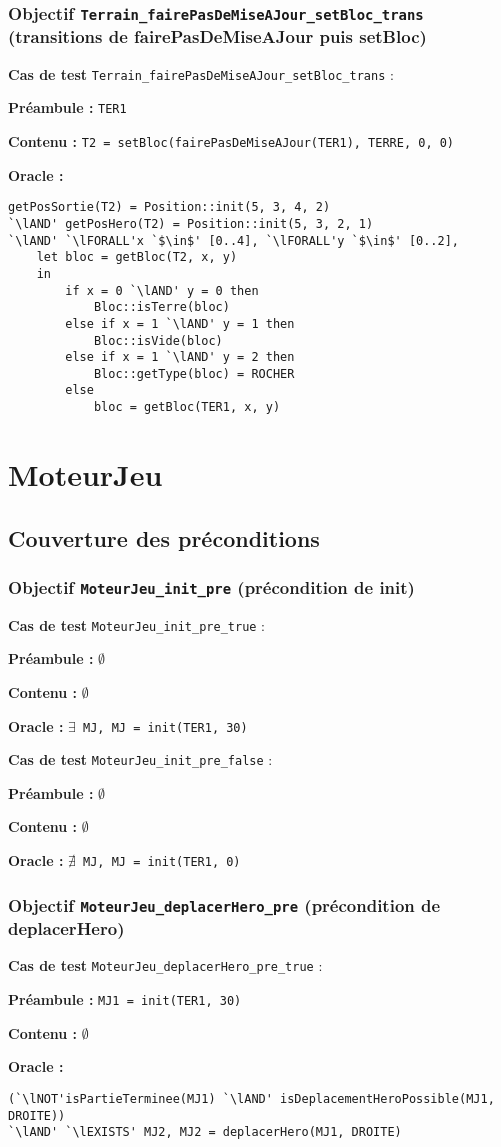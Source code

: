\documentclass{article}
\newcommand{\cmd}[1]{\texttt{#1}}
\newcommand{\lAND}{$\land$}
\newcommand{\lNOT}{$\lnot$}
\newcommand{\lFORALL}{$\forall$}
\newcommand{\lEXISTS}{$\exists$}
\newcommand{\lNEXISTS}{$\nexists{}$}
\newcommand{\obj}[2]{\subsubsection*{\large{\textbf{Objectif {\cmd{#1} (#2)}}}}}
\newenvironment{cas}[1]
{
	\hspace{1em}\textbf{Cas de test} \cmd{#1} :
	\begin{list}{}{}
}{
	\end{list}\vspace{1em}
}
\newcommand{\pre}[1]{\item \textbf{Préambule :} \cmd{#1}}
\newcommand{\npre}{\item \textbf{Préambule :} $\emptyset$}
\newcommand{\ope}[1]{\item \textbf{Contenu :} \cmd{#1}}
\newcommand{\nope}{\item \textbf{Contenu :} $\emptyset$}
\newcommand{\ora}[1]{\item \textbf{Oracle :} \cmd{#1}}
\newcommand{\oram}{\item \textbf{Oracle :}}
\begin{document}
\obj{Terrain\_fairePasDeMiseAJour\_setBloc\_trans} {transitions de fairePasDeMiseAJour puis setBloc}
	\begin{cas} {Terrain\_fairePasDeMiseAJour\_setBloc\_trans}
		\pre{TER1}
		\ope{T2 = setBloc(fairePasDeMiseAJour(TER1), TERRE, 0, 0)}
		\oram{}
		\begin{lstlisting}
getPosSortie(T2) = Position::init(5, 3, 4, 2)
`\lAND' getPosHero(T2) = Position::init(5, 3, 2, 1)
`\lAND' `\lFORALL'x `$\in$' [0..4], `\lFORALL'y `$\in$' [0..2],
	let bloc = getBloc(T2, x, y)
	in
		if x = 0 `\lAND' y = 0 then
			Bloc::isTerre(bloc)
		else if x = 1 `\lAND' y = 1 then
			Bloc::isVide(bloc)
		else if x = 1 `\lAND' y = 2 then
			Bloc::getType(bloc) = ROCHER
		else
			bloc = getBloc(TER1, x, y)
		\end{lstlisting}
	\end{cas}


























\section{MoteurJeu}


\subsection{Couverture des préconditions}

\obj{MoteurJeu\_init\_pre} {précondition de init}
	\begin{cas} {MoteurJeu\_init\_pre\_true}
		\npre{}
		\nope{}
		\ora{\lEXISTS{} MJ, MJ = init(TER1, 30)}
	\end{cas}

	\begin{cas} {MoteurJeu\_init\_pre\_false}
		\npre{}
		\nope{}
		\ora{\lNEXISTS{} MJ, MJ = init(TER1, 0)}
	\end{cas}


\obj{MoteurJeu\_deplacerHero\_pre} {précondition de deplacerHero}
	\begin{cas} {MoteurJeu\_deplacerHero\_pre\_true}
		\pre{MJ1 = init(TER1, 30)}
		\nope{}
		\oram{}
		\begin{lstlisting}
(`\lNOT'isPartieTerminee(MJ1) `\lAND' isDeplacementHeroPossible(MJ1, DROITE))
`\lAND' `\lEXISTS' MJ2, MJ2 = deplacerHero(MJ1, DROITE)
		\end{lstlisting}
	\end{cas}
\end{document}
